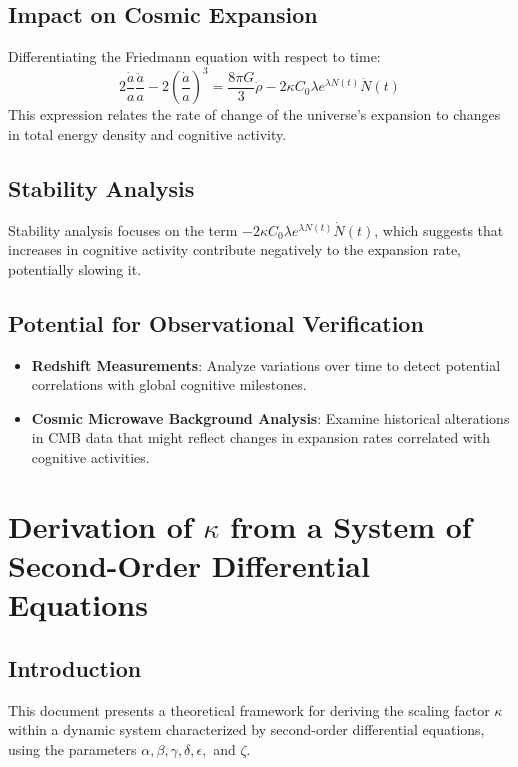 \documentclass{article}
\begin{document}
\subsection{Impact on Cosmic Expansion}
Differentiating the Friedmann equation with respect to time:
\begin{equation}
2\frac{\dot{a}}{a}\frac{\ddot{a}}{a} - 2\left(\frac{\dot{a}}{a}\right)^3 = \frac{8\pi G}{3} \dot{\rho} - 2\kappa C_0 \lambda e^{\lambda N(t)} \dot{N}(t)
\end{equation}
This expression relates the rate of change of the universe's expansion to changes in total energy density and cognitive activity.

\subsection{Stability Analysis}
Stability analysis focuses on the term \( -2\kappa C_0 \lambda e^{\lambda N(t)} \dot{N}(t) \), which suggests that increases in cognitive activity contribute negatively to the expansion rate, potentially slowing it.

\subsection{Potential for Observational Verification}
\begin{itemize}
    \item \textbf{Redshift Measurements}: Analyze variations over time to detect potential correlations with global cognitive milestones.
    \item \textbf{Cosmic Microwave Background Analysis}: Examine historical alterations in CMB data that might reflect changes in expansion rates correlated with cognitive activities.
\end{itemize}
\section{Derivation of \( \kappa \) from a System of Second-Order Differential Equations}

\subsection{Introduction}
This document presents a theoretical framework for deriving the scaling factor \( \kappa \) within a dynamic system characterized by second-order differential equations, using the parameters \( \alpha, \beta, \gamma, \delta, \epsilon, \) and \( \zeta \).
\end{document}
